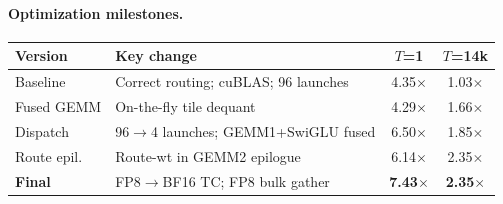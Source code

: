 \paragraph{Optimization milestones.}
\vspace{1pt}

\noindent\small
\begin{tabular}{@{}p{1.5cm}p{2.7cm}cc@{}}
\toprule
\textbf{Version} & \textbf{Key change} & \textbf{$T$=1} & \textbf{$T$=14k}\\
\midrule
Baseline    & Correct routing; cuBLAS; 96 launches & 4.35$\times$ & 1.03$\times$ \\
Fused GEMM  & On-the-fly tile dequant              & 4.29$\times$ & 1.66$\times$ \\
Dispatch    & 96$\to$4 launches; GEMM1+SwiGLU fused& 6.50$\times$ & 1.85$\times$ \\
Route epil. & Route-wt in GEMM2 epilogue           & 6.14$\times$ & 2.35$\times$ \\
\textbf{Final} & FP8$\to$BF16 TC; FP8 bulk gather & \textbf{7.43$\times$} & \textbf{2.35$\times$} \\
\bottomrule
\end{tabular}
\normalsize
